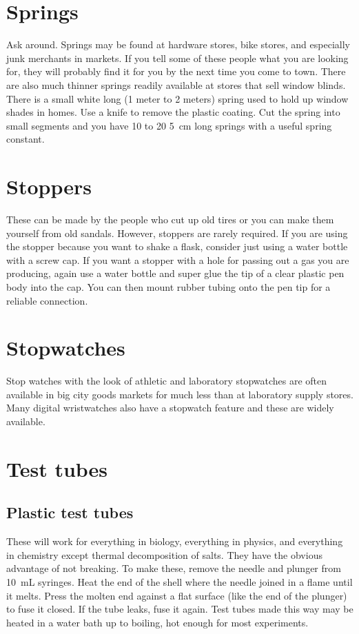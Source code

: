 \section{Springs}
Ask around. 
Springs may be found at hardware stores, 
bike stores, 
and especially junk merchants in markets. 
If you tell some of these people what you are looking for, 
they will probably find it for you by the next time you come to town. 
There are also much thinner springs 
readily available at stores that sell window blinds. 
There is a small white long (1 meter to 2 meters) spring 
used to hold up window shades in homes. 
Use a knife to remove the plastic coating. 
Cut the spring into small segments 
and you have 10 to 20 5~cm long springs with a useful spring constant. 

\section{Stoppers}
These can be made by the people who cut up old tires 
or you can make them yourself from old sandals. 
However, 
stoppers are rarely required. 
If you are using the stopper because you want to shake a flask, 
consider just using a water bottle with a screw cap. 
If you want a stopper with a hole for passing out a gas you are producing, 
again use a water bottle 
and super glue the tip of a clear plastic pen body into the cap. 
You can then mount rubber tubing onto the pen tip 
for a reliable connection.

\section{Stopwatches}
Stop watches with the look of athletic and laboratory stopwatches 
are often available in big city goods markets 
for much less than at laboratory supply stores. 
Many digital wristwatches also have a stopwatch feature 
and these are widely available.

\section{Test tubes}
\label{sec:testtubes}
\subsection{Plastic test tubes}
These will work for everything in biology, 
everything in physics, 
and everything in chemistry except thermal decomposition of salts. 
They have the obvious advantage of not breaking. 
To make these, 
remove the needle and plunger from 10~mL syringes. 
Heat the end of the shell where the needle joined in a flame until it melts. 
Press the molten end against a flat surface (like the end of the plunger) 
to fuse it closed. 
If the tube leaks, 
fuse it again. 
Test tubes made this way may be heated in a water bath up to boiling, 
hot enough for most experiments.

